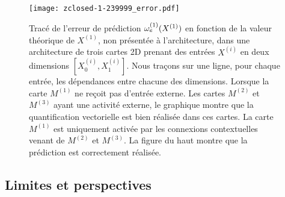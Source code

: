 \documentclass[../main]{subfiles}
\begin{document}
\begin{figure}
\texttt{[image: zclosed-1-239999\_error.pdf]}
\caption{Tracé de l'erreur de prédiction $\omega_e^{({1})}(X^{({1})})$ en fonction de la valeur théorique de $X^{(1)}$, non présentée à l'architecture, dans une architecture de trois cartes 2D prenant des entrées $X^{(i)}$ en deux dimensions $[X^{(i)}_0, X^{(i)}_1]$. Nous traçons sur une ligne, pour chaque entrée, les dépendances entre chacune des dimensions.
Lorsque la carte $M^{(1)}$ ne reçoit pas d'entrée externe. Les cartes $M^{(2)}$ et $M^{(3)}$ ayant une activité externe, le graphique montre que la quantification vectorielle est bien réalisée dans ces cartes. La carte $M^{(1)}$ est uniquement activée par les connexions contextuelles venant de $M^{(2)}$ et $M^{(3)}$. La figure du haut montre que la prédiction est correctement réalisée.\label{fig:3som_pred}}
\end{figure}

\subsection{Limites et perspectives}





\ifSubfilesClassLoaded{
    \printbibliography
}{}
\end{document}
